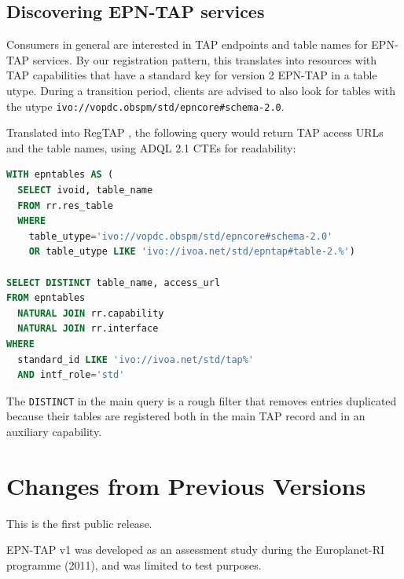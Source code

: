 \documentclass[11pt,a4paper]{ivoa}
\begin{document}
\subsection{Discovering EPN-TAP services}

Consumers in general are interested in TAP endpoints and table names for
EPN-TAP services.  By our registration pattern, this translates into
resources with TAP capabilities that have a standard key for version 2
EPN-TAP in a table utype.  During a transition period, clients are
advised to also look for tables with the utype
\verb|ivo://vopdc.obspm/std/epncore#schema-2.0|.

Translated into RegTAP \citep{2019ivoa.spec.1011D}, the following query
would return TAP access URLs and the table names, using ADQL 2.1 CTEs
for readability:

\begin{lstlisting}[language=SQL]
WITH epntables AS (
  SELECT ivoid, table_name
  FROM rr.res_table
  WHERE
    table_utype='ivo://vopdc.obspm/std/epncore#schema-2.0'
    OR table_utype LIKE 'ivo://ivoa.net/std/epntap#table-2.%')

SELECT DISTINCT table_name, access_url
FROM epntables
  NATURAL JOIN rr.capability
  NATURAL JOIN rr.interface
WHERE
  standard_id LIKE 'ivo://ivoa.net/std/tap%'
  AND intf_role='std'
\end{lstlisting}

The \texttt{DISTINCT} in the main query is a rough filter that removes
entries duplicated because their tables are registered both in the main
TAP record and in an auxiliary capability.

\appendix
\section{Changes from Previous Versions}

This is the first public release.

EPN-TAP v1 was developed as an assessment study
during the Europlanet-RI programme (2011), and was limited to test purposes.




\end{document}
